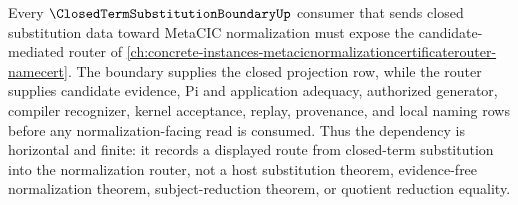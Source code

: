 \begin{theorem}
\label{thm:closed-term-substitution-boundary-normalization-router-dependency-route}
Every $\ClosedTermSubstitutionBoundaryUp$ consumer that sends closed substitution data toward MetaCIC normalization must expose the candidate-mediated router of \autoref{ch:concrete-instances-metacicnormalizationcertificaterouter-namecert}. The boundary supplies the closed projection row, while the router supplies candidate evidence, Pi and application adequacy, authorized generator, compiler recognizer, kernel acceptance, replay, provenance, and local naming rows before any normalization-facing read is consumed. Thus the dependency is horizontal and finite: it records a displayed route from closed-term substitution into the normalization router, not a host substitution theorem, evidence-free normalization theorem, subject-reduction theorem, or quotient reduction equality.
\end{theorem}
